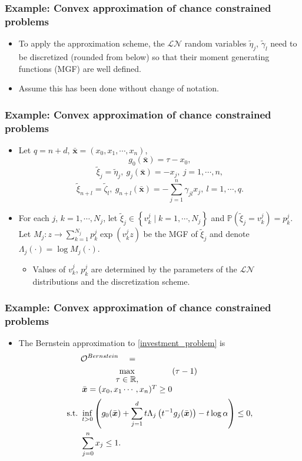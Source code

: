 \documentclass{beamer}
\begin{document}
\begin{frame}
	\frametitle{Example: Convex approximation of chance constrained problems}
	\begin{itemize}
	\item To apply the approximation scheme, the $\mathcal{LN}$ random variables $\tilde \eta_j$, $\tilde \gamma_l$ need to be discretized (rounded from below) so that their moment generating functions (MGF) are well defined. 
	\item Assume this has been done without change of notation.
	\end{itemize}
\end{frame}

\begin{frame}
	\frametitle{Example: Convex approximation of chance constrained problems}
	\begin{itemize}
	\item Let $q=n+d$, $\bar{\boldsymbol{x}}=(x_0, x_1, \cdots, x_n)$,
	\[g_0(\bar{\boldsymbol{x}}) = \tau - x_0,\]
	\[\tilde{\xi}_j = \tilde{\eta}_j,\ g_j(\bar{\boldsymbol{x}}) = -x_j,\ j=1,\cdots, n,\] 
	\[\tilde{\xi}_{n+l} = \tilde{\zeta}_l,\ g_{n+l}(\bar{\boldsymbol{x}}) = -\sum_{j=1}^n \gamma_{jl}x_j,\ l=1,\cdots,q.\]
	\item For each $j$, $k=1, \cdots, N_j$, let $\tilde{\xi}_j \in \left\{v_k^j \mid k=1,\cdots, N_j \right\}$ and $\mathbb{P}\left(\tilde{\xi}_j = v_k^j\right) = p_k^j$. Let $M_j: z \rightarrow \sum_{k=1}^{N_j} p_k^j \exp \left(v_k^j z\right)$ be the MGF of $\tilde{\xi}_j$ and denote $\Lambda_j(\cdot) = \log M_j(\cdot)$.
	\begin{itemize}
		\item Values of $v^j_k$, $p^j_k$ are determined by the parameters of the $\mathcal{LN}$ distributions and the discretization scheme.
	\end{itemize}
	\end{itemize}
\end{frame}

\begin{frame}
	\frametitle{Example: Convex approximation of chance constrained problems}
	\begin{itemize}
		\item The Bernstein approximation to \eqref{investment_problem} is 
		\begin{align} \label{Bernstein_approx_direct_form}
		\begin{split}
		&\mathcal{O}^{Bernstein}\quad =\quad \\
		&\max_{\begin{matrix}
			\tau \in \mathbb{R},\\ 	
			\bar{\boldsymbol{x}} = (x_0, x_1\cdots,x_n)^T \geq 0
			\end{matrix}} (\tau - 1)\ \ \ \\
		\textnormal{s.t.}\ & \inf_{t>0} \left(g_0(\bar{\boldsymbol{x}}) + \sum_{j=1}^d t \Lambda_j\left(t^{-1}g_j(\bar{\boldsymbol{x}})\right) - t\log \alpha \right) \leq 0,\\
		& \sum_{j=0}^n x_j \leq 1.\ \ 
		\end{split}
		\end{align}	
	\end{itemize}
\end{frame}
\end{document}
